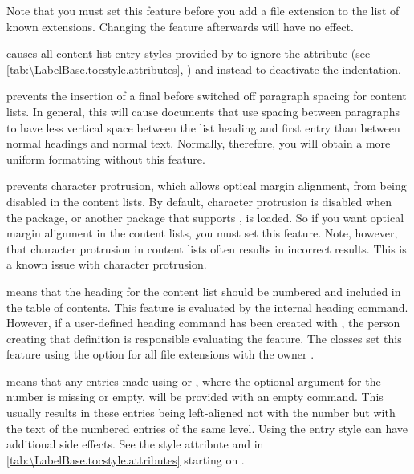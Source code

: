 \begin{description}
  Note that you must set this feature before you add a
  file extension to the list of known extensions. Changing the feature
  afterwards will have no effect.
\item[\PValue{noindent}]%
  causes all content-list entry styles provided by \KOMAScript{} to ignore
  the  attribute (see
  \autoref{tab:\LabelBase.tocstyle.attributes},
  ) and instead to
  deactivate the indentation.%
\item[\PValue{noparskipfake}] prevents
  the insertion of a final  before switched off paragraph
  spacing for content lists. In general, this will cause documents that use
  spacing between paragraphs to have less vertical space between the list
  heading and first entry than between normal headings and normal text.
  Normally, therefore, you will obtain a more uniform formatting without this
  feature.
\item[\PValue{noprotrusion}] prevents
  character protrusion, which allows optical margin alignment, from being
  disabled in the content lists. By default, character protrusion is disabled
  when the  package, or another
  package that supports , is
  loaded. So if you want optical margin alignment in the content lists, you
  must set this feature. Note, however, that character
  protrusion in content lists often results in incorrect results. This is a
  known issue with character protrusion.
\item[\PValue{numbered}] means that the heading for the content list should
  be numbered and included in the table of contents. This feature is evaluated
  by the internal heading command. However, if a user-defined heading command
  has been created with , the person
  creating that definition is responsible evaluating the feature. The
  \KOMAScript{} classes set this feature using the
   option for all file extensions
  with the owner .
\item[\PValue{numberline}] \leavevmode{}%
  means that any entries made using 
  or , where the
  optional argument for the number is missing or empty, will be provided with
  an empty  command. This usually results
  in these entries being left-aligned not with the number but with the text of
  the numbered entries of the same level.
  Using the  entry style
  can have additional side effects. See the style attribute
   and  in
  \autoref{tab:\LabelBase.tocstyle.attributes} starting on
  .


\end{description}

